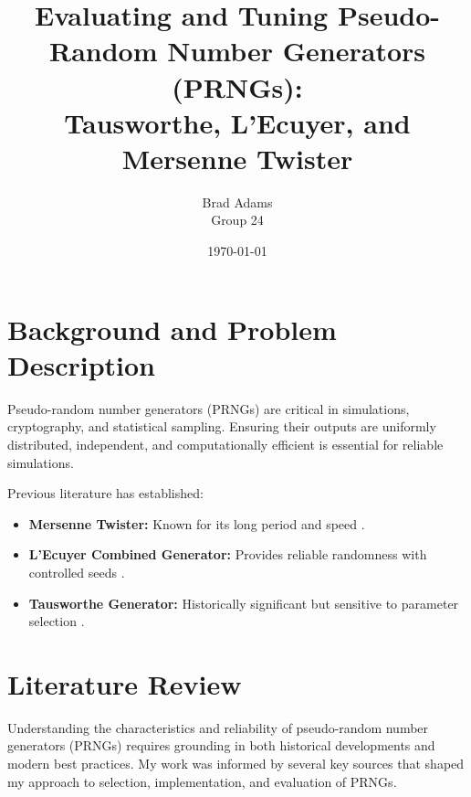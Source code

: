 \documentclass[twocolumn,12pt]{article}
\title{Evaluating and Tuning Pseudo-Random Number Generators (PRNGs):\\ Tausworthe, L’Ecuyer, and Mersenne Twister}
\author{Brad Adams\\Group 24}
\date{\today}
\begin{document}

\section{Background and Problem Description}
Pseudo-random number generators (PRNGs) are critical in simulations, cryptography, and statistical sampling. Ensuring their outputs are uniformly distributed, independent, and computationally efficient is essential for reliable simulations.

Previous literature has established:
\begin{itemize}
    \item \textbf{Mersenne Twister:} Known for its long period and speed \cite{matsumoto1998mersenne}.
    \item \textbf{L’Ecuyer Combined Generator:} Provides reliable randomness with controlled seeds \cite{lecuyer1999good}.
    \item \textbf{Tausworthe Generator:} Historically significant but sensitive to parameter selection \cite{knuth1997art}.
\end{itemize}

\section{Literature Review}

Understanding the characteristics and reliability of pseudo-random number generators (PRNGs) requires grounding in both historical developments and modern best practices. My work was informed by several key sources that shaped my approach to selection, implementation, and evaluation of PRNGs.
\end{document}

